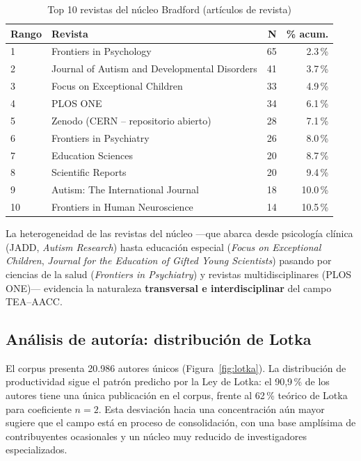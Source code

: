\documentclass[12pt, a4paper]{article}
\begin{document}
\begin{table}[H]
\centering
\caption{Top 10 revistas del núcleo Bradford (artículos de revista)}
\label{tab:revistas}
\small
\begin{tabularx}{\textwidth}{@{}l l r r@{}}
\toprule
\textbf{Rango} & \textbf{Revista} & \textbf{N} & \textbf{\% acum.} \\
\midrule
1  & Frontiers in Psychology                              & 65  & 2.3\,\% \\
2  & Journal of Autism and Developmental Disorders        & 41  & 3.7\,\% \\
3  & Focus on Exceptional Children                        & 33  & 4.9\,\% \\
4  & PLOS ONE                                             & 34  & 6.1\,\% \\
5  & Zenodo (CERN -- repositorio abierto)                 & 28  & 7.1\,\% \\
6  & Frontiers in Psychiatry                              & 26  & 8.0\,\% \\
7  & Education Sciences                                   & 20  & 8.7\,\% \\
8  & Scientific Reports                                   & 20  & 9.4\,\% \\
9  & Autism: The International Journal                    & 18  & 10.0\,\% \\
10 & Frontiers in Human Neuroscience                      & 14  & 10.5\,\% \\
\bottomrule
\end{tabularx}
\end{table}

La heterogeneidad de las revistas del núcleo —que abarca desde psicología clínica
(JADD, \textit{Autism Research}) hasta educación especial (\textit{Focus on
Exceptional Children}, \textit{Journal for the Education of Gifted Young Scientists})
pasando por ciencias de la salud (\textit{Frontiers in Psychiatry}) y revistas
multidisciplinares (PLOS ONE)— evidencia la naturaleza \textbf{transversal e
interdisciplinar} del campo TEA--AACC.

\subsection{Análisis de autoría: distribución de Lotka}

El corpus presenta 20.986 autores únicos (Figura~\ref{fig:lotka}). La distribución
de productividad sigue el patrón predicho por la Ley de Lotka: el 90,9\,\% de los
autores tiene una única publicación en el corpus, frente al 62\,\% teórico de Lotka
para coeficiente $n=2$. Esta desviación hacia una concentración aún mayor sugiere
que el campo está en proceso de consolidación, con una base amplísima de
contribuyentes ocasionales y un núcleo muy reducido de investigadores especializados.
\end{document}
